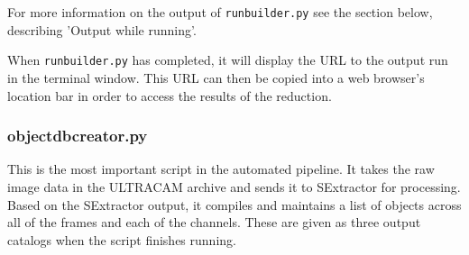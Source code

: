 For more information on the output of \texttt{runbuilder.py} see the section below, describing 'Output while running'.

When \texttt{runbuilder.py} has completed, it will display the URL to the output run in the terminal window. This URL can then be copied into a web browser's location bar in order to access the results of the reduction.

\subsubsection{objectdbcreator.py}

This is the most important script in the automated pipeline. It takes the raw image data in the ULTRACAM archive and sends it to SExtractor for processing. Based on the SExtractor output, it compiles and maintains a list of objects across all of the frames and each of the channels. These are given as three output catalogs when the script finishes running. 

